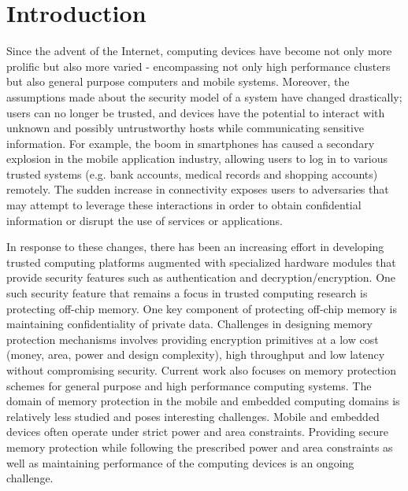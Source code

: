 \section{Introduction}
\label{sec-introduction}


Since the advent of the Internet, computing devices have become not only more
prolific but also more varied - encompassing not only high performance
clusters but also general purpose computers and mobile systems.  Moreover, the
assumptions made about the security model of a system have changed drastically;
users can no longer be trusted, and devices have the potential to interact with
unknown and possibly untrustworthy hosts while communicating sensitive
information. For example, the boom in smartphones has caused a secondary
explosion in the mobile application industry, allowing users to log in to
various trusted systems (e.g. bank accounts, medical records and shopping
accounts) remotely.  The sudden increase in connectivity exposes users to
adversaries that may attempt to leverage these interactions in order to obtain
confidential information or disrupt the use of services or applications.

In response to these changes, there has been an increasing effort in developing
trusted computing platforms augmented with specialized hardware modules that
provide security features such as authentication and decryption/encryption. One
such security feature that remains a focus in trusted computing research is
protecting off-chip memory. One key component of protecting off-chip memory is
maintaining confidentiality of private data. Challenges in designing memory
protection mechanisms involves providing encryption primitives at a low cost
(money, area, power and design complexity), high throughput and low latency
without compromising security. Current work also focuses on memory protection
schemes for general purpose and high performance computing systems. The domain
of memory protection in the mobile and embedded computing domains is relatively
less studied and poses interesting challenges. Mobile and embedded devices
often operate under strict power and area constraints. Providing secure memory
protection while following the prescribed power and area constraints as well as
maintaining performance of the computing devices is an ongoing challenge.

